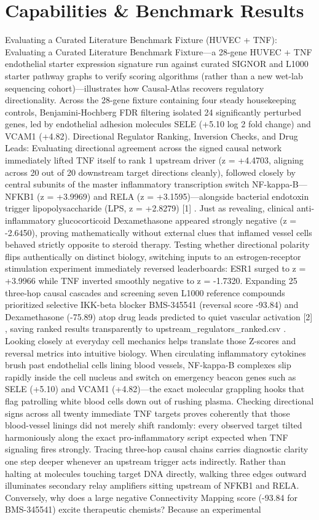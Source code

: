 \documentclass[10pt,letterpaper]{article}
\begin{document}
\section{Capabilities \& Benchmark Results}
Evaluating a Curated Literature Benchmark Fixture (HUVEC + TNF): Evaluating a Curated Literature Benchmark Fixture---a 28-gene HUVEC + TNF endothelial starter expression signature run against curated SIGNOR and L1000 starter pathway graphs to verify scoring algorithms (rather than a new wet-lab sequencing cohort)---illustrates how Causal-Atlas recovers regulatory directionality. Across the 28-gene fixture containing four steady housekeeping controls, Benjamini-Hochberg FDR filtering isolated 24 significantly perturbed genes, led by endothelial adhesion molecules SELE (+5.10 log 2 fold change) and VCAM1 (+4.82). Directional Regulator Ranking, Inversion Checks, and Drug Leads: Evaluating directional agreement across the signed causal network immediately lifted TNF itself to rank 1 upstream driver (z = +4.4703, aligning across 20 out of 20 downstream target directions cleanly), followed closely by central subunits of the master inflammatory transcription switch NF-kappa-B---NFKB1 (z = +3.9969) and RELA (z = +3.1595)---alongside bacterial endotoxin trigger lipopolysaccharide (LPS, z = +2.8279) [1] . Just as revealing, clinical anti-inflammatory glucocorticoid Dexamethasone appeared strongly negative (z = -2.6450), proving mathematically without external clues that inflamed vessel cells behaved strictly opposite to steroid therapy. Testing whether directional polarity flips authentically on distinct biology, switching inputs to an estrogen-receptor stimulation experiment immediately reversed leaderboards: ESR1 surged to z = +3.9966 while TNF inverted smoothly negative to z = -1.7320. Expanding 25 three-hop causal cascades and screening seven L1000 reference compounds prioritized selective IKK-beta blocker BMS-345541 (reversal score -93.84) and Dexamethasone (-75.89) atop drug leads predicted to quiet vascular activation [2] , saving ranked results transparently to upstream\_regulators\_ranked.csv . Looking closely at everyday cell mechanics helps translate those Z-scores and reversal metrics into intuitive biology. When circulating inflammatory cytokines brush past endothelial cells lining blood vessels, NF-kappa-B complexes slip rapidly inside the cell nucleus and switch on emergency beacon genes such as SELE (+5.10) and VCAM1 (+4.82)---the exact molecular grappling hooks that flag patrolling white blood cells down out of rushing plasma. Checking directional signs across all twenty immediate TNF targets proves coherently that those blood-vessel linings did not merely shift randomly: every observed target tilted harmoniously along the exact pro-inflammatory script expected when TNF signaling fires strongly. Tracing three-hop causal chains carries diagnostic clarity one step deeper whenever an upstream trigger acts indirectly. Rather than halting at molecules touching target DNA directly, walking three edges outward illuminates secondary relay amplifiers sitting upstream of NFKB1 and RELA. Conversely, why does a large negative Connectivity Mapping score (-93.84 for BMS-345541) excite therapeutic chemists? Because an experimental 
\end{document}
